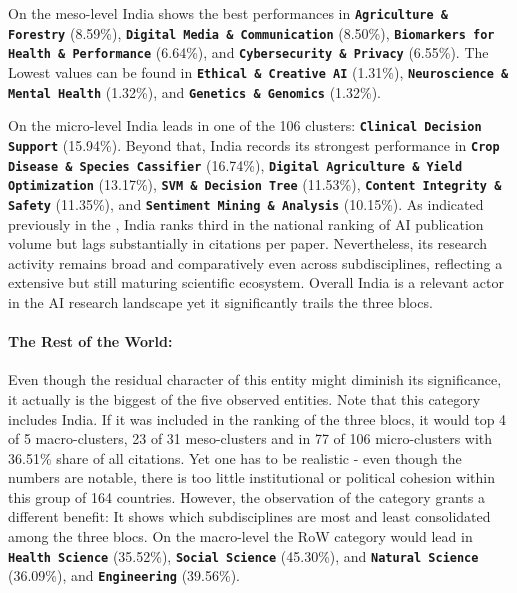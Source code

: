 \documentclass{article}
\begin{document}
	On the meso-level India shows the best performances in \textbf{\texttt{Agriculture \& Forestry}}  (8.59\%), \textbf{\texttt{Digital Media \& Communication}}  (8.50\%), \textbf{\texttt{Biomarkers for Health \& Performance}}  (6.64\%), and \textbf{\texttt{Cybersecurity \& Privacy}}  (6.55\%). The Lowest values can be found in \textbf{\texttt{Ethical \& Creative AI}}  (1.31\%), \textbf{\texttt{Neuroscience \& Mental Health}}  (1.32\%), and \textbf{\texttt{Genetics \& Genomics}}  (1.32\%).
	
	On the micro-level India leads in one of the 106 clusters: \textbf{\texttt{Clinical Decision Support}}  (15.94\%). Beyond that, India records its strongest performance in \textbf{\texttt{Crop Disease \& Species Cassifier}}  (16.74\%), \textbf{\texttt{Digital Agriculture \& Yield Optimization}}  (13.17\%), \textbf{\texttt{SVM \& Decision Tree}}  (11.53\%), \textbf{\texttt{Content Integrity \& Safety}}  (11.35\%), and \textbf{\texttt{Sentiment Mining \& Analysis}}  (10.15\%). As indicated previously in the , India ranks third in the national ranking of AI publication volume but lags substantially in citations per paper. Nevertheless, its research activity remains broad and comparatively even across subdisciplines, reflecting a extensive but still maturing scientific ecosystem. Overall India is a relevant actor in the AI research landscape yet it significantly trails the three blocs.
	
	\paragraph{The Rest of the World:} Even though the residual character of this entity might diminish its significance, it actually is the biggest of the five observed entities. Note that this category includes India. If it was included in the ranking of the three blocs, it would top 4 of 5 macro-clusters, 23 of 31 meso-clusters and in 77 of 106 micro-clusters with 36.51\% share of all citations. Yet one has to be realistic - even though the numbers are notable, there is too little institutional or political cohesion within this group of 164 countries. However, the observation of the category grants a different benefit: It shows which subdisciplines are most and least consolidated among the three blocs. On the macro-level the RoW category would lead in \textbf{\texttt{Health Science}}  (35.52\%), \textbf{\texttt{Social Science}}  (45.30\%), and \textbf{\texttt{Natural Science}}  (36.09\%), and \textbf{\texttt{Engineering}}  (39.56\%).
	
\end{document}
